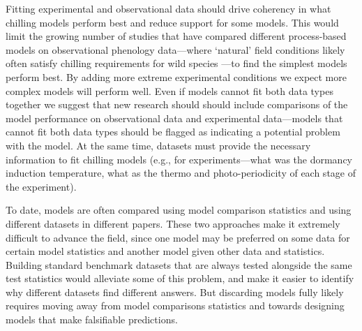 \documentclass[11pt]{article}
\begin{document}
Fitting experimental and observational data should drive coherency in what chilling models perform best and reduce support for some models. This would limit the growing number of studies that have compared different process-based models on observational phenology data---where `natural' field conditions likely often satisfy chilling requirements for wild species \citep{basler2016evaluating,hufkens2018integrated}---to find the simplest models perform best. By adding more extreme experimental conditions we expect more complex models will perform well. Even if models cannot fit both data types together we suggest that new research should should include comparisons of the model performance on observational data and experimental data---models that cannot fit both data types should be flagged as indicating a potential problem with the model.  At the same time, datasets must provide the necessary information to fit chilling models (e.g., for experiments---what was the dormancy induction temperature, what as the thermo and photo-periodicity of each stage of the experiment). 

To date, models are often compared using model comparison statistics and using different datasets in different papers. These two approaches make it extremely difficult to advance the field, since one model may be preferred on some data for certain model statistics and another model given other data and statistics. Building standard benchmark datasets that are always tested alongside the same test statistics would alleviate some of this problem, and make it easier to identify why different datasets find different answers. But discarding models fully likely requires moving away from model comparisons statistics and towards designing models that make falsifiable predictions.
\end{document}
